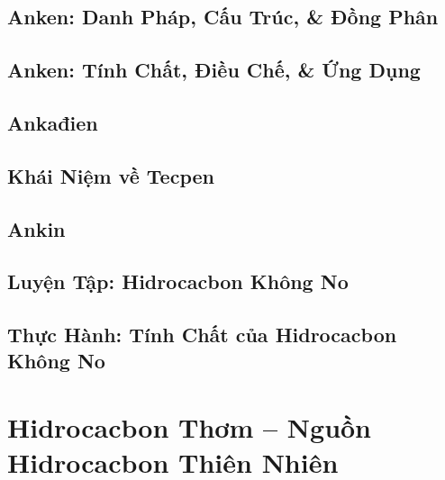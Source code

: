 \documentclass[oneside]{book}
\numberwithin{equation}{section}
\begin{document}
\section{Anken: Danh Pháp, Cấu Trúc, \& Đồng Phân}


\section{Anken: Tính Chất, Điều Chế, \& Ứng Dụng}


\section{Ankađien}


\section{Khái Niệm về Tecpen}


\section{Ankin}


\section{Luyện Tập: Hidrocacbon Không No}


\section{Thực Hành: Tính Chất của Hidrocacbon Không No}


\chapter{Hidrocacbon Thơm -- Nguồn Hidrocacbon Thiên Nhiên}
\end{document}
